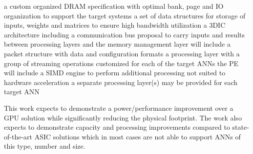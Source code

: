 \begin{outline}
\renewcommand{\outlinei}{enumerate}
  \vspace{-3mm}
  \1 a custom organized DRAM specification with optimal bank, page and IO organization to support the target systems
  \vspace{-3mm}
  \1 a set of data structures for storage of inputs, weights and matrices to ensure high bandwidth utilization
  \vspace{-3mm}
  \1 a 3DIC architecture including a communication bus proposal to carry inputs and results between processing layers and the memory management layer
    \vspace{-3mm}
    \2 will include a packet structure with data and configuration formats
   \vspace{-3mm}
   \1 a processing layer with a group of streaming operations customized for each of the target ANNs 
    \vspace{-3mm}
    \2 the PE will include a SIMD engine to perform additional processing not suited to hardware acceleration
    \vspace{-1mm}
    \2 a separate processing layer(s) may be provided for each target ANN
\end{outline}
\vspace{-2mm}
This work expects to demonstrate a \iffalse greater than \else \fi power/performance improvement over a GPU solution while \iftrue significantly \fi reducing
the physical footprint.
The work also expects to demonstrate \iffalse significant \fi capacity and processing improvements compared to state-of-the-art ASIC solutions
which in most cases are not able to support ANNs of this type, number and size.

